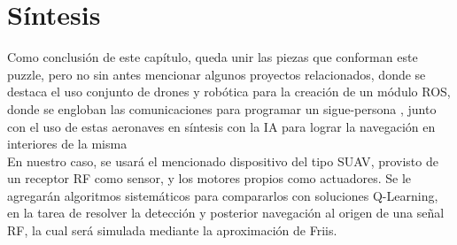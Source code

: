 \section{Síntesis}
\label{subsec:sintesis}

Como conclusión de este capítulo, queda unir las piezas que conforman este puzzle, pero no sin antes mencionar algunos proyectos relacionados, donde se destaca el uso conjunto de drones y robótica para la creación de un módulo ROS, donde se engloban las comunicaciones para programar un sigue-persona \cite{tfm-pedro}, junto con el uso de estas aeronaves en síntesis con la \ac{IA} para lograr la navegación en interiores de la misma \cite{paper-ia-dron}\\

En nuestro caso, se usará el mencionado dispositivo del tipo \ac{SUAV}, provisto de un receptor \ac{RF} como sensor, y los motores propios como actuadores. Se le agregarán algoritmos sistemáticos para compararlos con soluciones Q-Learning, en la tarea de resolver la detección y posterior navegación al origen de una señal \ac{RF}, la cual será simulada mediante la aproximación de Friis.